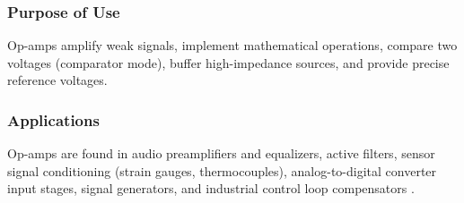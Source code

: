 \subsubsection*{Purpose of Use}
Op-amps amplify weak signals, implement mathematical operations, compare two voltages
(comparator mode), buffer high-impedance sources, and provide precise reference voltages.

\subsubsection*{Applications}
Op-amps are found in audio preamplifiers and equalizers, active filters, sensor signal
conditioning (strain gauges, thermocouples), analog-to-digital converter input stages,
signal generators, and industrial control loop compensators \cite{sedra2020}.
